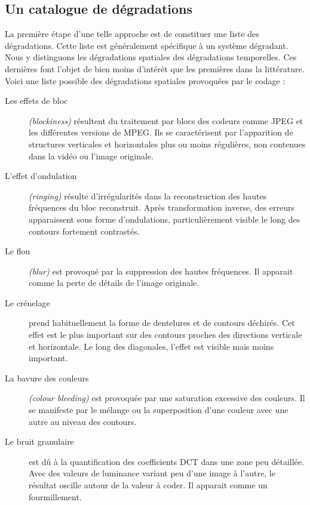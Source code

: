 \subsection{Un catalogue de dégradations} \label{ssec:catalogueDeg}
La première étape d'une telle approche est de constituer une liste des dégradations. Cette liste est généralement spécifique à un système dégradant. Nous y distinguons les dégradations spatiales des dégradations temporelles. Ces dernières font l'objet de bien moins d'intérêt que les premières dans la littérature. Voici une liste possible des dégradations spatiales provoquées par le codage :
\begin{description}
\item[Les effets de bloc] \emph{(blockiness)} résultent du traitement par blocs des codeurs comme JPEG et les différentes versions de MPEG. Ils se caractérisent par l'apparition de structures verticales et horizontales plus ou moins régulières, non contenues dans la vidéo ou l'image originale.
\item[L'effet d'ondulation] \emph{(ringing)} résulte d'irrégularités dans la reconstruction des hautes fréquences du bloc reconstruit. Après transformation inverse, des erreurs apparaissent sous forme d'ondulations, particulièrement visible le long des contours fortement contrastés.
\item[Le flou] \emph{(blur)} est provoqué par la suppression des hautes fréquences. Il apparait comme la perte de détails de l'image originale.
\item[Le crénelage] prend habituellement la forme de dentelures et de contours déchirés. Cet effet est le plus important sur des contours proches des directions verticale et horizontale. Le long des diagonales, l'effet est visible mais moins important.
\item[La bavure des couleurs] \emph{(colour bleeding)} est provoquée par une saturation excessive des couleurs. Il se manifeste par le mélange ou la superposition d'une couleur avec une autre au niveau des contours.
\item[Le bruit granulaire] est dû à la quantification des coefficients DCT dans une zone peu détaillée. Avec des valeurs de luminance variant peu d'une image à l'autre, le résultat oscille autour de la valeur à coder. Il apparait comme un fourmillement.
\end{description}

